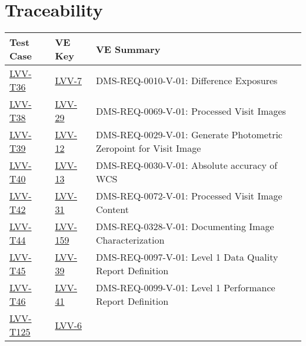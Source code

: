 \section{Traceability}

\begin{longtable}{p{3cm}p{3cm}L{9cm}}
\hline
\textbf{Test Case} & \textbf{VE Key} & \textbf{VE Summary} \\ \hline
\href{https://jira.lsstcorp.org/secure/Tests.jspa#/testCase/LVV-T36}{LVV-T36} &
  \href{https://jira.lsstcorp.org/browse/LVV-7}{LVV-7}
  & DMS-REQ-0010-V-01: Difference Exposures
 \\ 
\hline
\href{https://jira.lsstcorp.org/secure/Tests.jspa#/testCase/LVV-T38}{LVV-T38} &
  \href{https://jira.lsstcorp.org/browse/LVV-29}{LVV-29}
  & DMS-REQ-0069-V-01: Processed Visit Images
 \\ 
\hline
\href{https://jira.lsstcorp.org/secure/Tests.jspa#/testCase/LVV-T39}{LVV-T39} &
  \href{https://jira.lsstcorp.org/browse/LVV-12}{LVV-12}
  & DMS-REQ-0029-V-01: Generate Photometric Zeropoint for Visit Image
 \\ 
\hline
\href{https://jira.lsstcorp.org/secure/Tests.jspa#/testCase/LVV-T40}{LVV-T40} &
  \href{https://jira.lsstcorp.org/browse/LVV-13}{LVV-13}
  & DMS-REQ-0030-V-01: Absolute accuracy of WCS
 \\ 
\hline
\href{https://jira.lsstcorp.org/secure/Tests.jspa#/testCase/LVV-T42}{LVV-T42} &
  \href{https://jira.lsstcorp.org/browse/LVV-31}{LVV-31}
  & DMS-REQ-0072-V-01: Processed Visit Image Content
 \\ 
\hline
\href{https://jira.lsstcorp.org/secure/Tests.jspa#/testCase/LVV-T44}{LVV-T44} &
  \href{https://jira.lsstcorp.org/browse/LVV-159}{LVV-159}
  & DMS-REQ-0328-V-01: Documenting Image Characterization
 \\ 
\hline
\href{https://jira.lsstcorp.org/secure/Tests.jspa#/testCase/LVV-T45}{LVV-T45} &
  \href{https://jira.lsstcorp.org/browse/LVV-39}{LVV-39}
  & DMS-REQ-0097-V-01: Level 1 Data Quality Report Definition
 \\ 
\hline
\href{https://jira.lsstcorp.org/secure/Tests.jspa#/testCase/LVV-T46}{LVV-T46} &
  \href{https://jira.lsstcorp.org/browse/LVV-41}{LVV-41}
  & DMS-REQ-0099-V-01: Level 1 Performance Report Definition
 \\ 
\hline
\href{https://jira.lsstcorp.org/secure/Tests.jspa#/testCase/LVV-T125}{LVV-T125} &
  \href{https://jira.lsstcorp.org/browse/LVV-6}{LVV-6}

\end{longtable}
